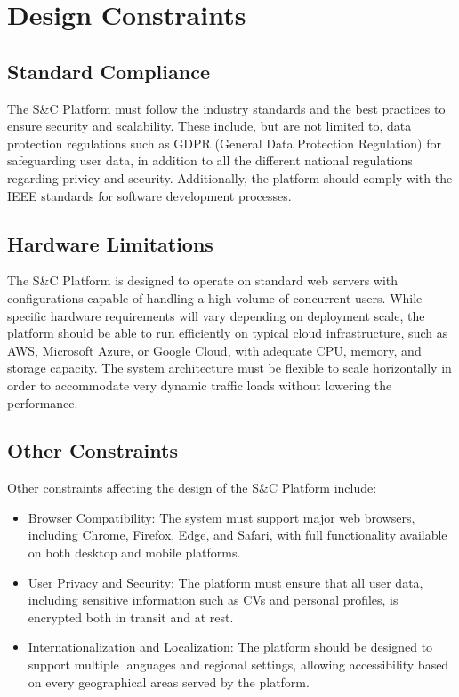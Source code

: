 \section{Design Constraints}

\subsection{Standard Compliance}
The S\&C Platform must follow the industry standards 
and the best practices to ensure security and scalability. 
These include, but are not limited to, 
data protection regulations such as GDPR (General Data Protection Regulation) 
for safeguarding user data, in addition to all the different national regulations regarding privicy and security.
Additionally, the platform should comply with the IEEE standards 
for software development processes.

\subsection{Hardware Limitations}
The S\&C Platform is designed to operate on standard
 web servers with configurations capable of handling a high volume of concurrent users. 
 While specific hardware requirements will vary depending on deployment scale, 
 the platform should be able to run efficiently on typical cloud infrastructure, 
 such as AWS, Microsoft Azure, or Google Cloud, with adequate CPU, memory, and storage capacity. 
 The system architecture must be flexible to scale horizontally in order to accommodate very dynamic traffic loads without lowering the performance.

\subsection{Other Constraints}
Other constraints affecting the design of the S\&C Platform include:
\begin {itemize}
\item Browser Compatibility: The system must support major web browsers, 
including Chrome, Firefox, Edge, and Safari, with full functionality 
available on both desktop and mobile platforms.
  
\item User Privacy and Security: The platform must ensure that all user data, 
including sensitive information such as CVs and personal profiles, 
is encrypted both in transit and at rest.
  
\item Internationalization and Localization: The platform should be designed 
to support multiple languages and regional settings, allowing accessibility
based on every geographical areas served by the platform.
\end {itemize}

